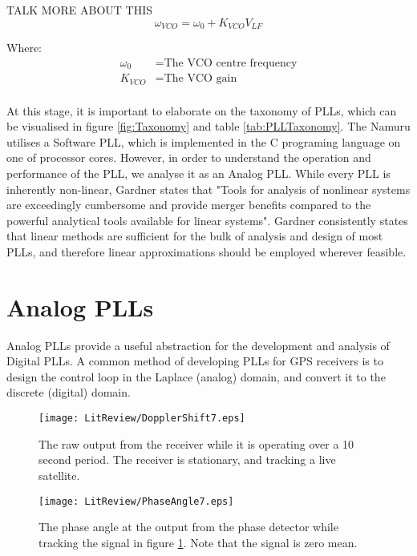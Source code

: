 TALK MORE ABOUT THIS
\begin{equation}
	\omega_{VCO} = \omega_0 + K_{VCO}V_{LF}
\end{equation}

Where:
\begin{align*}
	\omega_0 &= \text{The VCO centre frequency}\\
	K_{VCO} &= \text{The VCO gain}\\
\end{align*}




At this stage, it is important to elaborate on the taxonomy of PLLs, which can be visualised in figure \ref{fig:Taxonomy} and table \ref{tab:PLLTaxonomy}. The Namuru utilises a Software PLL, which is implemented in the C programing language on one of processor cores. However, in order to understand the operation and performance of the PLL, we analyse it as an Analog PLL. While every PLL is inherently non-linear, Gardner states that "Tools for analysis of nonlinear systems are exceedingly cumbersome and provide merger benefits compared to the powerful analytical tools available for linear systems". Gardner consistently states that linear methods are sufficient for the bulk of analysis and design of most PLLs, and therefore linear approximations should be employed wherever feasible\cite{Gardner}. 



\clearpage

\section{Analog PLLs}

Analog PLLs provide a useful abstraction for the development and analysis of Digital PLLs. A common method of developing PLLs for \ac{GPS} receivers is to design the control loop in the Laplace (analog) domain, and convert it to the discrete (digital) domain. 

\begin{figure}[!htb] 
    \centering
    \texttt{[image: LitReview/DopplerShift7.eps]} 
    \caption{The raw output from the receiver while it is operating over a 10 second period. 
    The receiver is stationary, and tracking a live satellite.}
    \label{fig:DopplerShiftStationary}
\end{figure}

\begin{figure}[!htb] 
    \centering
    \texttt{[image: LitReview/PhaseAngle7.eps]} 
    \caption{The phase angle at the output from the phase detector while tracking the signal in figure \ref{fig:DopplerShiftStationary}. Note that the signal is zero mean.}
    \label{fig:PhaseAngleStationary}
\end{figure}

